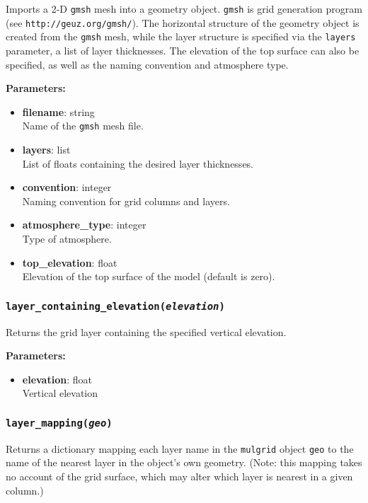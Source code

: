 Imports a 2-D \texttt{gmsh} mesh into a geometry object.  \texttt{gmsh} is grid generation program (see \texttt{http://geuz.org/gmsh/}).  The horizontal structure of the geometry object is created from the \texttt{gmsh} mesh, while the layer structure is specified via the \texttt{layers} parameter, a list of layer thicknesses.  The elevation of the top surface can also be specified, as well as the naming convention and atmosphere type.

\textbf{Parameters:}
\begin{itemize}
\item \textbf{filename}: string\\
  Name of the \texttt{gmsh} mesh file.
\item \textbf{layers}: list\\
  List of floats containing the desired layer thicknesses.
\item \textbf{convention}: integer\\
  Naming convention for grid columns and layers.
\item \textbf{atmosphere\_type}: integer\\
  Type of atmosphere.
\item \textbf{top\_elevation}: float\\
  Elevation of the top surface of the model (default is zero).
\end{itemize}

\subsubsection{\texttt{layer\_containing\_elevation(\emph{elevation})}}

Returns the grid layer containing the specified vertical elevation.

\textbf{Parameters:}
\begin{itemize}
\item \textbf{elevation}: float\\
  Vertical elevation
\end{itemize}

\subsubsection{\texttt{layer\_mapping(\emph{geo})}}

Returns a dictionary mapping each layer name in the \texttt{mulgrid} object \texttt{geo} to the name of the nearest layer in the object's own geometry.  (Note: this mapping takes no account of the grid surface, which may alter which layer is nearest in a given column.)

